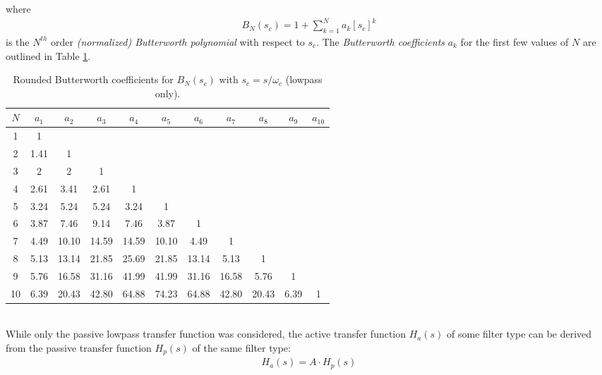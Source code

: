 \documentclass{report}
\begin{document}
where 
\begin{align}
    B_N(s_c) = 1 + \sum_{k=1}^{N} a_k [s_c]^k
\end{align}
is the $N^{th}$ order \emph{(normalized) Butterworth polynomial} with respect to $s_c$. The \emph{Butterworth coefficients} $a_k$ for the first 
few values of $N$ are outlined in Table \ref{butt_coeffs}.
\begin{table}[!hbt]
    \centering
    \caption{Rounded Butterworth coefficients for $B_N(s_c)$ with $s_c=s/\omega_c$ (lowpass only).}
    \label{butt_coeffs}
    \begin{tabular}{|c|c|c|c|c|c|c|c|c|c|c|}
        \hline
        $N$ & $a_1$ & $a_2$ & $a_3$ & $a_4$ & $a_5$ & $a_6$ & $a_7$ & $a_8$ & $a_9$ & $a_{10}$ \\
        \hline
        1 & 1 & & & & & & & & & \\
        \hline
        2 & 1.41 & 1 & & & & & & & & \\
        \hline
        3 & 2 & 2 & 1 & & & & & & & \\
        \hline
        4 & 2.61 & 3.41 & 2.61 & 1 & & & & & & \\
        \hline
        5 & 3.24 & 5.24 & 5.24 & 3.24 & 1 & & & & & \\
        \hline
        6 & 3.87 & 7.46 & 9.14 & 7.46 & 3.87 & 1 & & & & \\
        \hline
        7 & 4.49 & 10.10 & 14.59 & 14.59 & 10.10 & 4.49 & 1 & & & \\
        \hline
        8 & 5.13 & 13.14 & 21.85 & 25.69 & 21.85 & 13.14 & 5.13 & 1 & & \\
        \hline
        9 & 5.76 & 16.58 & 31.16 & 41.99 & 41.99 & 31.16 & 16.58 & 5.76 & 1 & \\
        \hline
        10 & 6.39 & 20.43 & 42.80 & 64.88 & 74.23 & 64.88 & 42.80 & 20.43 & 6.39 & 1 \\
        \hline
    \end{tabular}
\end{table}
\\
\noindent While only the passive lowpass transfer function was considered, the active transfer function $H_a(s)$ of some filter type can be derived from 
the passive transfer function $H_p(s)$ of the same filter type: 
\begin{align}
    H_{a}(s) = A\cdot H_{p}(s)
\end{align} 
\end{document}
